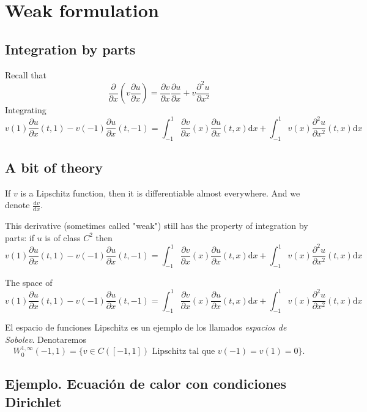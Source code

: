 \section{Weak formulation}\label{weak-formulation}

\subsection{Integration by parts}\label{integration-by-parts}

\newcommand{\diff}{\mathrm{d}}

Recall that \[
    \frac{\partial}{\partial x} \left( v \frac{\partial u}{\partial x} \right)  =   \frac{\partial v}{\partial x} \frac{\partial u}{\partial x} + v \frac{\partial^2 u}{\partial x^2}
\]
Integrating \[
    v(1) \frac{\partial u}{\partial x}(t,1) -  v(-1) \frac{\partial u}{\partial x}(t,-1) =  \int_{-1}^1 \frac{\partial v}{\partial x} (x) \frac{\partial u}{\partial x}(t,x) \diff x + \int_{-1}^1 v(x) \frac{\partial^2 u}{\partial x^2} (t,x) \diff x
\]

\subsection{A bit of theory}\label{a-bit-of-theory}

If \(v\) is a Lipschitz function, then it is differentiable almost everywhere. And we denote \(\frac{\diff v}{\diff x}\).

This derivative (sometimes called "weak") still has the property of integration by parts: if \(u\) is of class \(C^2\) then \[
    v(1) \frac{\partial u}{\partial x}(t,1) -  v(-1) \frac{\partial u}{\partial x}(t,-1) =  \int_{-1}^1 \frac{\partial v}{\partial x} (x) \frac{\partial u}{\partial x}(t,x) \diff x + \int_{-1}^1 v(x) \frac{\partial^2 u}{\partial x^2} (t,x) \diff x
\]

The space of
\[
    v(1) \frac{\partial u}{\partial x}(t,1) -  v(-1) \frac{\partial u}{\partial x}(t,-1) =  \int_{-1}^1 \frac{\partial v}{\partial x} (x) \frac{\partial u}{\partial x}(t,x) \diff x + \int_{-1}^1 v(x) \frac{\partial^2 u}{\partial x^2} (t,x) \diff x
\]



El espacio de funciones Lipschitz es un ejemplo de los llamados
\emph{espacios de Sobolev}. Denotaremos \[
    W^{1,\infty}_0 (-1,1) = \{ v \in C([-1,1])  \text{ Lipschitz tal que } v(-1) = v(1) = 0 \}.
\]

\subsection{Ejemplo. Ecuación de calor con condiciones
    Dirichlet}\label{ejemplo-ecuaciuxf3n-de-calor-con-condiciones-dirichlet}

